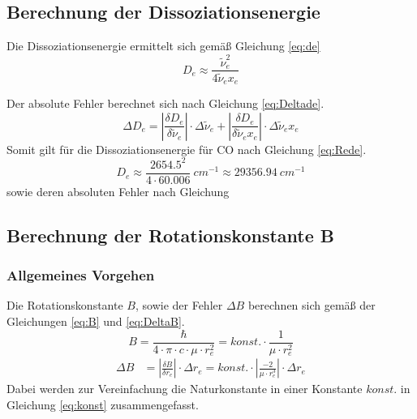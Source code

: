 \subsection{Berechnung der Dissoziationsenergie}
Die Dissoziationsenergie ermittelt sich gemäß Gleichung \ref{eq:de}
\begin{equation} 
	\label{eq:de}
		D_e \approx \frac{\tilde{\nu}_e^2}{4 \tilde{\nu}_e x_e}
\end{equation}

Der absolute Fehler berechnet sich nach Gleichung \ref{eq:Deltade}.
\begin{equation} 
	\label{eq:Deltade}
		\Delta D_e =\left|\frac{\delta D_e}{\delta \tilde{\nu}_e}\right|\cdot \Delta \tilde{\nu}_e + \left|\frac{\delta D_e}{\delta \tilde{\nu}_e x_e}\right|\cdot \Delta \tilde{\nu}_e x_e 
\end{equation}
Somit gilt für die Dissoziationsenergie für CO nach Gleichung \ref{eq:Rede}.
\begin{equation} 
	\label{eq:Rede}
		D_e \approx \frac{2654.5^2}{4\cdot60.006} ~\si
{cm^{-1}}  \approx  \SI[mode=math]{29356.94}{cm^{-1}} 
\end{equation}
sowie deren absoluten Fehler nach Gleichung 









\subsection{Berechnung der Rotationskonstante B}
\subsubsection*{Allgemeines Vorgehen}
Die Rotationskonstante $B$, sowie der Fehler $\Delta B$ berechnen sich gemäß der Gleichungen \ref{eq:B} und \ref{eq:DeltaB}.
\begin{equation}
B 	   			= \frac{\hbar}{4 \cdot \pi \cdot c \cdot \mu  \cdot r_e^{2}}  			
   			= konst.\cdot\frac{1}{\mu  \cdot r_e^{2}}\label{eq:B}
\end{equation}
\begin{align}   			
\Delta B	
   			&=  \left|\frac{\delta B}{\delta r_e}\right|\cdot\Delta r_e =konst. \cdot\left|\frac{-2}{\mu \cdot r_e^{3}  }\right|\cdot \Delta r_e  	\label{eq:DeltaB}	
\end{align}
Dabei werden zur Vereinfachung die Naturkonstante in einer Konstante $konst.$ in Gleichung \ref{eq:konst} zusammengefasst.


